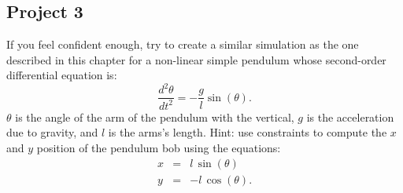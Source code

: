 \subsection*{Project 3}
If you feel confident enough, try to create a similar simulation as the one described in this chapter for a non-linear simple pendulum whose second-order differential equation is:
\begin{equation}
  \frac{d^2\theta}{dt^2} = -\frac{g}{l} \sin (\theta).
\end{equation}
\noindent $\theta$ is the angle of the arm of the pendulum with the vertical, $g$ is the acceleration due to gravity, and $l$ is the arms's length. Hint: use constraints to compute the $x$ and $y$ position of the pendulum bob using the equations:
\begin{eqnarray*}
   x   &=&  l \, \sin (\theta) \\
   y   &=& -l \, \cos (\theta).
\end{eqnarray*}

